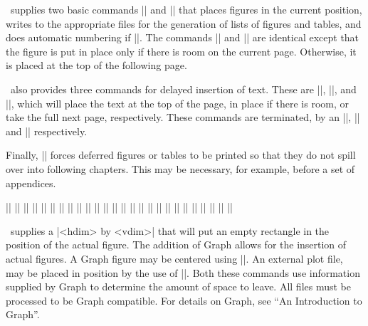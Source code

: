   \relax \fi %

\def\cqu{\cquote{Example is always more efficacious than precept.}{Rasselas,
Samuel~Johnson (1709-1784)} 
}


\intex\ supplies two basic commands |\figureform| and |\tableform| 
that places figures in the current position, writes to the appropriate files
for the generation of 
lists of figures and tables, and
does automatic numbering if
|\autonumberingon|. The commands |\figureinsert| and |\tableinsert|
are identical except that the figure is put in place only if there is room on
the current page. Otherwise, it is placed at the top of the following page.

\intex\  also provides three commands for delayed insertion
of text. These are |\begintopinsert|, |\beginmidinsert|, and |\beginpageinsert|, which will
place the text at the top of the page, in place if there is room, or take the
full next page, respectively. These commands are terminated, by an
|\endtopinsert|, |\endmidinsert| and |\endpageinsert| respectively. 

Finally, |\ejectinserts| forces deferred figures or tables to be printed so
that they do not spill over into following chapters. This may be necessary,
for example, before a set of appendices. 

\begingroup \hfuzz=20pt
\beginthreecolumn
\ext|\beginmidinsert|
\ext|\beginpageinsert|
\ext|\begintopinsert|
\ext|\captionbox|
\ext|\captionnumfont|
\ext|\captiontextfraction|
\ext|\captiontitlefont|
\ext|\captionbodyfont|
\ext|\captionbody|
\ext|\captionbodyon|
\ext|\captionbodyoff|
\ext|\centergraph|
\ext|\centerplotfile|
\ext|\ejectinserts|
\ext|\endmidinsert|
\ext|\endpageinsert|
\ext|\endtopinsert|
\ext|\figureform|
\ext|\figureinsert|
\ext|\figurelabel|
\ext|\rect|
\ext|\tableform|
\ext|\tableinsert|
\ext|\tablelabel|
\ext|\topcaptiontrue|
\ext|\topcaptionfalse|
\endthreecolumn
\endgroup 

\intex\ supplies a |\rect <hdim> by <vdim>| that will put an empty rectangle
in the position of the actual figure. The addition of
\tex Graph allows for the insertion of actual figures. A \tex Graph figure
may be centered using ||. An external plot file, may be
placed in position by the use of ||. Both these
commands use information supplied by \tex Graph to determine the amount of
space to leave. All files must be processed to be \tex Graph compatible. For
details on \tex Graph, see ``An Introduction to \tex Graph''.

